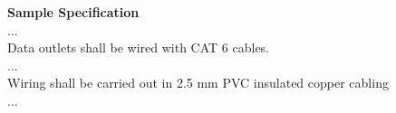 \newpage

\textbf{Sample Specification}\\

...\\
Data outlets shall be wired with CAT 6 cables.\\
...\\
Wiring shall be carried out in 2.5 mm PVC insulated copper cabling\\
...\\

